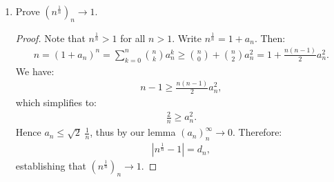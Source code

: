 \begin{example}
\begin{enumerate}[label = (\arabic*)]
            \item Prove $(n^\frac{1}{n})_n \rightarrow 1$.
                \begin{proof}
                    Note that $n^\frac{1}{n} > 1$ for all $n> 1$. Write $n^\frac{1}{n} = 1 + a_n$. Then:
                        \begin{equation*}
                        \begin{split}
                            n = (1+a_n)^n = \sum_{k=0}^n {n \choose k}a_n^k \geq {n \choose 0} + {n \choose 2}a_n^2 = 1 + \frac{n(n-1)}{2}a_n^2.
                        \end{split}
                        \end{equation*}
                    We have:
                        \begin{equation*}
                        \begin{split}
                            n-1 \geq \frac{n(n-1)}{2}a_n^2,
                        \end{split}
                        \end{equation*}
                    which simplifies to:
                        \begin{equation*}
                        \begin{split}
                            \frac{2}{n} \geq a_n^2.
                        \end{split}
                        \end{equation*}
                    Hence $a_n \leq \sqrt{2} \hspace{3pt} \displaystyle{\frac{1}{n}}$, thus by our lemma $(a_n)_n^\infty \rightarrow 0$. Therefore:
                        \begin{equation*}
                        \begin{split}
                            |n^\frac{1}{n} - 1| = d_n,
                        \end{split}
                        \end{equation*}
                    establishing that $(n^\frac{1}{n})_n \rightarrow 1$.
                \end{proof}
        \end{enumerate}
    \end{example}

